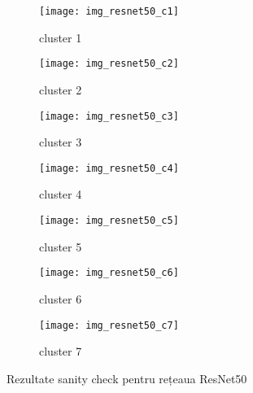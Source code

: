 \begin{figure}[!h]
  \centering
  \begin{subfigure}[b]{0.45\textwidth}
    \texttt{[image: img\_resnet50\_c1]}
    \caption{cluster 1}
  \end{subfigure}
  \hfill
  \begin{subfigure}[b]{0.45\textwidth}
    \texttt{[image: img\_resnet50\_c2]}
    \caption{cluster 2}
  \end{subfigure}
   \hfill
  \begin{subfigure}[b]{0.45\textwidth}
    \texttt{[image: img\_resnet50\_c3]}
    \caption{cluster 3}
  \end{subfigure}
  \hfill
  \begin{subfigure}[b]{0.45\textwidth}
    \texttt{[image: img\_resnet50\_c4]}
    \caption{cluster 4}
  \end{subfigure}
  \hfill
  \begin{subfigure}[b]{0.45\textwidth}
    \texttt{[image: img\_resnet50\_c5]}
    \caption{cluster 5}
  \end{subfigure}
  \hfill
  \begin{subfigure}[b]{0.45\textwidth}
    \texttt{[image: img\_resnet50\_c6]}
    \caption{cluster 6}
  \end{subfigure}
    \hfill
  \begin{subfigure}[b]{0.45\textwidth}
    \texttt{[image: img\_resnet50\_c7]}
    \caption{cluster 7}
  \end{subfigure}
  \caption[Rezultate sanity check pentru rețeaua ResNet50]{Rezultate sanity check pentru rețeaua ResNet50}
\end{figure}


